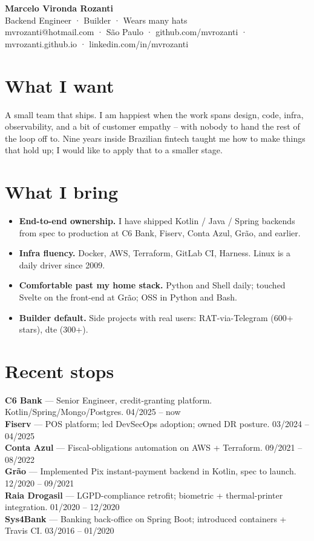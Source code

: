 \documentclass[10pt,a4paper]{article}
\begin{document}
\begin{center}
{\Huge\bfseries Marcelo Vironda Rozanti}\\[2pt]
{\large\color{accent} Backend Engineer · Builder · Wears many hats}\\[3pt]
{\small mvrozanti@hotmail.com · São Paulo · github.com/mvrozanti · mvrozanti.github.io · linkedin.com/in/mvrozanti}
\end{center}

\section{What I want}
A small team that ships. I am happiest when the work spans design, code, infra, observability, and a bit of customer empathy -- with nobody to hand the rest of the loop off to. Nine years inside Brazilian fintech taught me how to make things that hold up; I would like to apply that to a smaller stage.

\section{What I bring}
\begin{itemize}
\item \textbf{End-to-end ownership.} I have shipped Kotlin / Java / Spring backends from spec to production at C6 Bank, Fiserv, Conta Azul, Grão, and earlier.
\item \textbf{Infra fluency.} Docker, AWS, Terraform, GitLab CI, Harness. Linux is a daily driver since 2009.
\item \textbf{Comfortable past my home stack.} Python and Shell daily; touched Svelte on the front-end at Grão; OSS in Python and Bash.
\item \textbf{Builder default.} Side projects with real users: RAT-via-Telegram (600+ stars), dte (300+).
\end{itemize}

\section{Recent stops}

\noindent\textbf{C6 Bank} — Senior Engineer, credit-granting platform. Kotlin/Spring/Mongo/Postgres. \hfill 04/2025 -- now\\
\noindent\textbf{Fiserv} — POS platform; led DevSecOps adoption; owned DR posture. \hfill 03/2024 -- 04/2025\\
\noindent\textbf{Conta Azul} — Fiscal-obligations automation on AWS + Terraform. \hfill 09/2021 -- 08/2022\\
\noindent\textbf{Grão} — Implemented Pix instant-payment backend in Kotlin, spec to launch. \hfill 12/2020 -- 09/2021\\
\noindent\textbf{Raia Drogasil} — LGPD-compliance retrofit; biometric + thermal-printer integration. \hfill 01/2020 -- 12/2020\\
\noindent\textbf{Sys4Bank} — Banking back-office on Spring Boot; introduced containers + Travis CI. \hfill 03/2016 -- 01/2020
\end{document}
